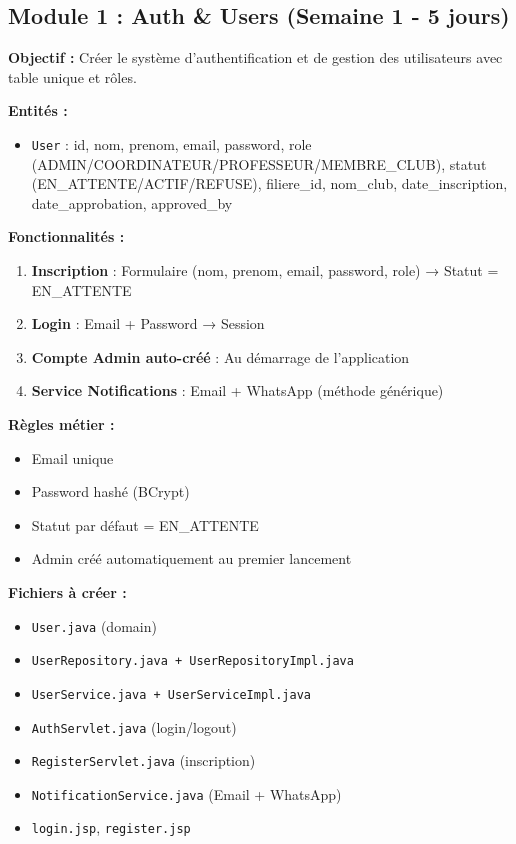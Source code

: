\documentclass[11pt,a4paper]{article}
\begin{document}
\subsection{Module 1 : Auth \& Users (Semaine 1 - 5 jours)}

\textbf{Objectif :} Créer le système d'authentification et de gestion des utilisateurs avec table unique et rôles.

\textbf{Entités :}
\begin{itemize}
    \item \texttt{User} : id, nom, prenom, email, password, role (ADMIN/COORDINATEUR/PROFESSEUR/MEMBRE\_CLUB), statut (EN\_ATTENTE/ACTIF/REFUSE), filiere\_id, nom\_club, date\_inscription, date\_approbation, approved\_by
\end{itemize}

\textbf{Fonctionnalités :}
\begin{enumerate}
    \item \textbf{Inscription} : Formulaire (nom, prenom, email, password, role) → Statut = EN\_ATTENTE
    \item \textbf{Login} : Email + Password → Session
    \item \textbf{Compte Admin auto-créé} : Au démarrage de l'application
    \item \textbf{Service Notifications} : Email + WhatsApp (méthode générique)
\end{enumerate}

\textbf{Règles métier :}
\begin{itemize}
    \item Email unique
    \item Password hashé (BCrypt)
    \item Statut par défaut = EN\_ATTENTE
    \item Admin créé automatiquement au premier lancement
\end{itemize}

\textbf{Fichiers à créer :}
\begin{itemize}
    \item \texttt{User.java} (domain)
    \item \texttt{UserRepository.java + UserRepositoryImpl.java}
    \item \texttt{UserService.java + UserServiceImpl.java}
    \item \texttt{AuthServlet.java} (login/logout)
    \item \texttt{RegisterServlet.java} (inscription)
    \item \texttt{NotificationService.java} (Email + WhatsApp)
    \item \texttt{login.jsp}, \texttt{register.jsp}
\end{itemize}
\end{document}
